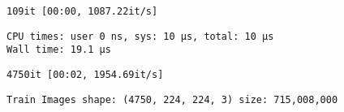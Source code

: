 \documentclass[11pt]{article}
\begin{document}
    \begin{Verbatim}[commandchars=\\\{\}]
109it [00:00, 1087.22it/s]
    \end{Verbatim}

    \begin{Verbatim}[commandchars=\\\{\}]
CPU times: user 0 ns, sys: 10 µs, total: 10 µs
Wall time: 19.1 µs

    \end{Verbatim}

    \begin{Verbatim}[commandchars=\\\{\}]
4750it [00:02, 1954.69it/s]
    \end{Verbatim}

    \begin{Verbatim}[commandchars=\\\{\}]
Train Images shape: (4750, 224, 224, 3) size: 715,008,000

    \end{Verbatim}

    \begin{Verbatim}[commandchars=\\\{\}]


    \end{Verbatim}
\end{document}
